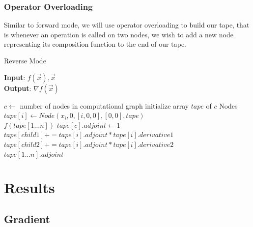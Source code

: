 \documentclass[a0,landscape]{a0poster}
\begin{document}
\begin{multicols}{4}
\subsubsection*{Operator Overloading}
Similar to forward mode, we will use operator overloading to build our tape, that
is whenever an operation is called on two nodes, we wish to add a new node
representing its composition function to the end of our tape.

\begin{algorithm}[H]
\caption{Reverse Mode}
    \hspace*{\algorithmicindent} \textbf{Input}: $f(\vec{x}),\vec{x}$ \\
    \hspace*{\algorithmicindent} \textbf{Output}: $\nabla f(\vec{x})$
\begin{algorithmic}[1]
\State $c\gets$ number of nodes in computational graph
\State initialize array $tape$ of $c$ Nodes
    \State $tape[i]\gets Node(x_i, 0, [i,0,0], [0,0], tape)$
\EndFor\\
$f(tape[1\dots n])$ 
    \State $tape[c].adjoint\gets 1$
    \State $tape[child1]+=tape[i].adjoint*tape[i].derivative1$
    \State $tape[child2]+=tape[i].adjoint*tape[i].derivative2$
\EndFor\\
    \Return $tape[1\dots n].adjoint$
\end{algorithmic}
\end{algorithm}

\section*{Results}
\subsection*{Gradient}
\begin{center}
\end{center}
\end{multicols}
\end{document}
